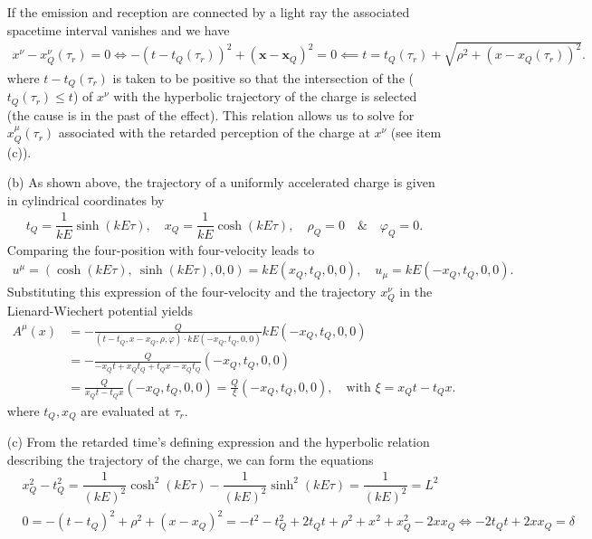 \documentclass[10pt, a4paper]{article}
\begin{document}
\begin{enumerate}
 If the emission and reception are connected by a light ray the associated spacetime interval vanishes and we have 
 \begin{align*}
  x^{\nu} - x^\nu_Q(\tau_r) = 0 \iff -(t-t_Q(\tau_r))^2+(\mathbf{x}-\boldsymbol{x}_Q)^2 = 0 \impliedby t = t_Q(\tau_r) + \sqrt{\rho^2 + (x-x_Q(\tau_r))^2}.
 \end{align*}
 where $t - t_Q(\tau_r)$ is taken to be positive so that the intersection of the  ($t_Q(\tau_r) \leq t$) of $x^{\nu}$ with the hyperbolic trajectory of the charge is selected (the cause is in the past of the effect). This relation allows us to solve for $x_Q^{\mu}(\tau_r)$ associated with the retarded perception of the charge at $x^{\nu}$ (see item (c)). 
  \item[(b)] As shown above, the trajectory of a uniformly accelerated charge is given in cylindrical coordinates by
  \begin{align*}
    t_Q = \dfrac{1}{kE}\sinh(kE \tau), \quad x_Q = \dfrac{1}{kE}\cosh(kE \tau),\quad \rho_Q = 0\quad \& \quad \varphi_Q = 0. 
  \end{align*}
  Comparing the four-position with four-velocity leads to 
  \begin{align*}
    u^\mu = (\cosh(kE \tau),\ \sinh(kE \tau), 0, 0) = kE (x_Q, t_Q, 0, 0), \quad u_\mu = kE (-x_Q, t_Q, 0, 0).
  \end{align*}
  Substituting this expression of the four-velocity and the trajectory $x^\nu_Q$ in the Lienard-Wiechert potential yields
  \begin{align*}
    A^\mu(x)&=-\frac{Q}{\left(t-t_Q, x-x_Q, \rho, \varphi\right) \cdot kE (-x_Q, t_Q, 0, 0)} kE (-x_Q, t_Q, 0, 0)\\
    &=-\frac{Q}{- x_Q t+ x_Qt_Q + t_Qx-x_Qt_Q}  (-x_Q, t_Q, 0, 0)\\
    &=\frac{Q}{x_Q t - t_Q x}  (-x_Q, t_Q, 0, 0) = \frac{Q}{\xi}  (-x_Q, t_Q, 0, 0), \quad \text{with $\xi = x_Q t - t_Qx$}.
 \end{align*}
 where $t_Q, x_Q$ are evaluated at $\tau_r$.
  \item[(c)] From the retarded time's defining expression and the hyperbolic relation describing the trajectory of the charge, we can form the equations  
  \begin{align*}
    &x_Q^2 - t_Q^2 = \dfrac{1}{(kE)^2}\cosh^2(kE \tau) - \dfrac{1}{(kE)^2}\sinh^2(kE \tau) = \dfrac{1}{(kE)^2} = L^2 \\
    &0=-(t-t_Q)^2 + \rho^2 + (x-x_Q)^2 = - t^2 - t_Q^2 + 2t_Qt + \rho^2 + x^2+x_Q^2 - 2x x_Q \iff  -2t_Qt + 2x x_Q = \delta

\end{align*}
\end{enumerate}
\end{document}
